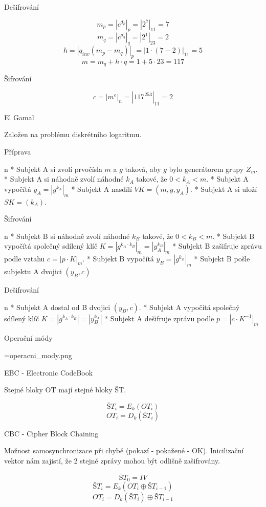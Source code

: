 Dešifrování

$$m_p = \left|c^{d_p}\right|_p = \left|2^7\right|_{11} = 7$$
$$m_q = \left|c^{d_q}\right|_q = \left|2^1\right|_{23} = 2$$
$$h = \left|q_{inv}\left(m_p - m_q\right)\right|_p = \left|1 \cdot \left(7 - 2\right)\right|_{11} = 5$$
$$m = m_q + h \cdot q = 1 + 5 \cdot 23 = 117$$

Šifrování

$$c = \left|m^e\right|_n = \left|117^253\right|_11 = 2$$

\sec El Gamal

Založen na problému diskrétního logaritmu.

\secc Příprava

\begitems \style n
* Subjekt A si zvolí prvočísla $m$ a $g$ taková, aby $g$ bylo generátorem grupy $Z_m$.
* Subjekt A si náhodně zvolí náhodné $k_A$ takové, že $0 < k_A < m$.
* Subjekt A vypočítá $y_A = \left|g^{k_A}\right|_m$
* Subjekt A nasdílí $VK = (m, g, y_A)$.
* Subjekt A si uloží $SK = (k_A)$.
\enditems

\secc Šifrování

\begitems \style n
* Subjekt B si náhodně zvolí náhodné $k_B$ takové, že $0 < k_B < m$.
* Subjekt B vypočítá společný sdílený klíč $K = \left|g^{k_A \cdot k_B}\right|_m = \left|y_A^{k_B}\right|_m$
* Subjekt B zašifruje zprávu podle vztahu $c = \left|p \cdot K\right|_m$.
* Subjekt B vypočítá $y_B = \left|g^{k_B}\right|_m$
* Subjekt B pošle subjektu A dvojici $\left(y_B, c\right)$
\enditems

\secc Dešifrování

\begitems \style n
* Subjekt A dostal od B dvojici $\left(y_B, c\right)$.
* Subjekt A vypočítá společný sdílený klíč $K = \left|g^{k_A \cdot k_B}\right| = \left|y_B^{k_A}\right|$
* Subjekt A dešifruje zprávu podle $p = \left|c \cdot K^{-1}\right|_m$
\enditems

\sec Operační módy

\centerline {\picwidth=\hsize \inspic operacni_mody.png }

\secc EBC - Electronic CodeBook

Stejné bloky OT mají stejné bloky ŠT.

$$ŠT_i = E_k\left(OT_i\right)$$
$$OT_i = D_k\left(ŠT_i\right)$$

\secc CBC - Cipher Block Chaining

Možnost samosynchronizace při chybě (pokazí - pokažené - OK). Inicilizační vektor nám zajistí, že 2 stejné zprávy mohou být odlišně zašifrovány.

$$ŠT_0 = IV$$
$$ŠT_i = E_k\left(OT_i \oplus ŠT_{i-1} \right)$$
$$OT_i = D_k\left(ŠT_{i} \right) \oplus ŠT_{i-1}$$

